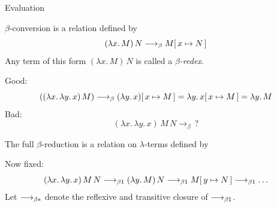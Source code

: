 \begin{frame}[allowframebreaks]{Evaluation}
\begin{definition}
  $\beta$-conversion is a relation defined by
  \[
    (\lambda x.\, M)\, N \longrightarrow_{\beta} M\subst{x}{N}
  \]
  Any term of this form $(\lambda x.\, M)\, N$ is called a \emph{$\beta$-redex}.
\end{definition}
  Good: 
    \[
      ((\lambda x.\,\lambda y.\,x)\,M)
      \longrightarrow_{\beta}
      (\lambda y.\, x)\subst{x}{M}
      = \lambda y.\, x\subst{x}{M}
      = \lambda y.\, M
    \]
  Bad: 
  \[
    (\lambda x.\, \lambda y.\, x)\, M\,N
    \longrightarrow_{\beta} \, ?
  \]
\framebreak
\begin{definition}
  The \alert{full $\beta$-reduction} is a relation on $\lambda$-terms
  defined by
  \begin{multicols}{2}
    \begin{prooftree}
    \end{prooftree}
    \begin{prooftree}
    \end{prooftree}
    \begin{prooftree}
    \end{prooftree}
    \begin{prooftree}
    \end{prooftree}
  \end{multicols}
\end{definition}
  Now fixed:
  \[
    (\lambda x.\, \lambda y.\, x)\, M\,N
    \onereduce (\lambda y.\, M)\,N
    \onereduce M\subst{y}{N} \onereduce \ldots
  \]
  Let $\reduce$ denote the reflexive and transitive closure of $\onereduce$. 
\end{frame}

